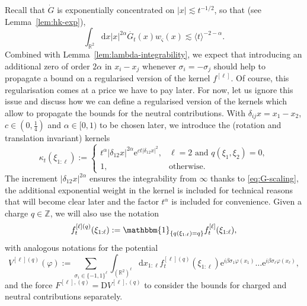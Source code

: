 \documentclass[11pt, a4paper]{scrartcl}
\numberwithin{equation}{section}
\theoremstyle{plain}
\theoremstyle{remark}
\newcommand{\assign}{:=}
\newcommand{\mathD}{\mathrm{D}}
\newcommand{\mathd}{\mathrm{d}}
\newcommand{\mathe}{\mathrm{e}}
\begin{document}
Recall that $\dot{G}$ is exponentially concentrated on $| x | \lesssim t^{- 1
/ 2}$, so that (see Lemma~\ref{lem:hk-exp}),
\begin{equation}
  \int_{\mathbb{R}^2} \mathd x | x |^{2 \alpha} \dot{G_t} (x) w_{\varsigma}
  (x) \lesssim \langle t \rangle^{- 2 - \alpha} . \label{eq:G-scaling}
\end{equation}
Combined with Lemma~\ref{lem:lambda-integrability}, we expect that introducing
an additional zero of order $2 \alpha$ in $x_i - x_j$ whenever $\sigma_i = -
\sigma_j$ should help to propagate a bound on a regularised version of the
kernel $f^{[\ell]}$. Of course, this regularisation comes at a price we have
to pay later. For now, let us ignore this issue and discuss how we can define
a regularised version of the kernels which allow to propagate the bounds for
the neutral contributions. With $\delta_{i j} x = x_1 - x_2$, $c \in \left( 0,
\frac{1}{4} \right)$ and $\alpha \in [0, 1)$ to be chosen later, we introduce
the (rotation and translation invariant) kernels
\begin{equation}
  \kappa_t (\xi_{1 : \ell}) \assign \begin{cases}
    t^{\alpha} | \delta_{12} x |^{2 \alpha} \mathe^{ct | \delta_{12} x |^2}, &
    \ell = 2 \text{ and } q (\xi_1, \xi_2) = 0,\\
    1, & \text{otherwise.}
  \end{cases} \label{eq:def-k}
\end{equation}
The increment $| \delta_{12} x |^{2 \alpha}$ ensures the integrability from
$\infty$ thanks to \eqref{eq:G-scaling}, the additional exponential weight in
the kernel is included for technical reasons that will become clear later and
the factor $t^{\alpha}$ is included for convenience. Given a charge $q \in
\mathbb{Z}$, we will also use the notation
\begin{equation}
  f^{[\ell] (q)}_t (\xi_{1 : \ell}) \assign \mathbbm{1}_{\{ q (\xi_{1 : \ell})
  = q \}} f^{[\ell]}_t (\xi_{1 : \ell}), \label{eq:def-f0}
\end{equation}
with analogous notations for the potential
\begin{equation}
  V^{[\ell] (q)} (\varphi) \assign \sum_{\sigma_i \in \{ - 1, 1 \}^{\ell}}
  \int_{(\mathbb{R}^2)^{\ell}} \mathd x_{1 : \ell} f_t^{[\ell] (q)} (\xi_{1 :
  \ell}) \mathe^{i \beta \sigma_1 \varphi (x_1)} \ldots \mathe^{i \beta
  \sigma_{\ell} \varphi (x_{\ell})}, \label{eq:def-f0-2}
\end{equation}
and the force $F^{[\ell], (q)} = \mathD V^{[\ell], (q)}$ to consider the
bounds for charged and neutral contributions separately.
\end{document}
